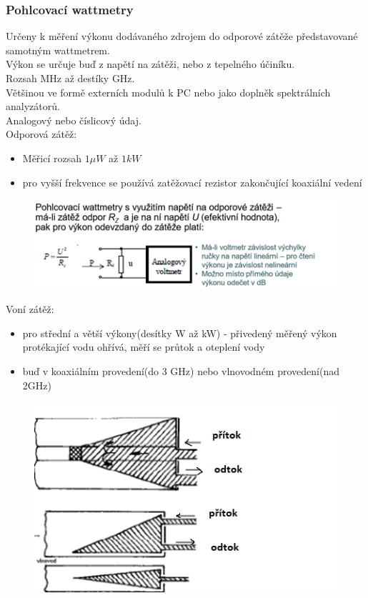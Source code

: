\subsubsection*{Pohlcovací wattmetry}
Určeny k měření výkonu dodávaného zdrojem do odporové zátěže představované samotným wattmetrem.\\
Výkon se určuje buď z napětí na zátěži, nebo z tepelného účiníku.\\
Rozsah MHz až destíky GHz.\\
Většinou ve formě externích modulů k PC nebo jako doplněk spektrálních analyzátorů.\\
Analogový nebo číslicový údaj.\\
Odporová zátěž:
\begin{itemize}
    \item Měřicí rozsah $1 \mu W$ až $1 kW$
    \item pro vyšší frekvence se používá zatěžovací rezistor zakončující koaxiální vedení
\end{itemize}
\begin{figure}[H]
    \includegraphics*[scale  = 1.3]{images/wattOdporovaZatez.png}
\end{figure}

Voní zátěž:
\begin{itemize}
    \item pro střední a větší výkony(desítky W až kW) - přivedený měřený výkon protékající vodu ohřívá, měří se průtok a oteplení vody
    \item buď v koaxiálním provedení(do 3 GHz) nebo vlnovodném provedení(nad 2GHz)
\end{itemize}
\begin{figure}[H]
    \includegraphics*[scale  = 1]{images/wattVodniZatez.png}
\end{figure}

